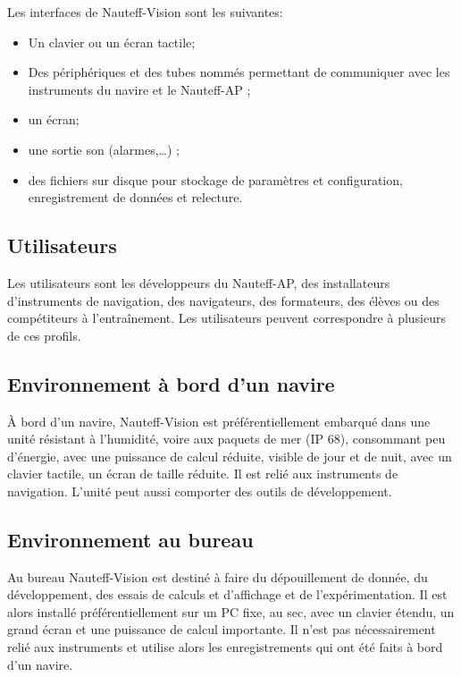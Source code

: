\documentclass[a4paper,11pt]{report}
\begin{document}
Les interfaces de Nauteff-Vision sont les suivantes:
\begin{itemize}
	\item Un clavier ou un écran tactile;
	\item Des périphériques et des tubes nommés permettant de communiquer avec les instruments du navire et le Nauteff-AP ;
	\item un écran;
	\item une sortie son (alarmes,\dots)  ;
	\item des fichiers sur disque pour stockage de paramètres et configuration, enregistrement de données et relecture.
\end{itemize}

\subsection{Utilisateurs}

Les utilisateurs sont les développeurs du Nauteff-AP, des installateurs
d'instruments de navigation, des navigateurs,
des formateurs, des élèves ou des compétiteurs à l'entraînement.
Les utilisateurs peuvent correspondre à plusieurs de ces profils.


\subsection{Environnement à bord d'un navire}

À bord d'un navire, Nauteff-Vision est préférentiellement embarqué
dans une unité résistant à l'humidité, voire
aux paquets de mer (IP 68),
consommant peu d'énergie,
avec une puissance de calcul réduite,
visible de jour et de nuit,
avec un clavier tactile,
un écran de taille réduite.
Il est relié aux instruments de navigation.
L'unité peut aussi comporter des outils de développement.


\subsection{Environnement au bureau}

Au bureau Nauteff-Vision est destiné à faire du dépouillement de donnée,
du développement, des essais de calculs et d'affichage et de l'expérimentation.
Il est alors installé préférentiellement sur un PC fixe,
au sec, avec un clavier étendu, un grand écran et
une puissance de calcul importante.
Il n'est pas nécessairement relié aux instruments et
utilise alors les enregistrements qui ont été faits à bord d'un navire.
\end{document}
